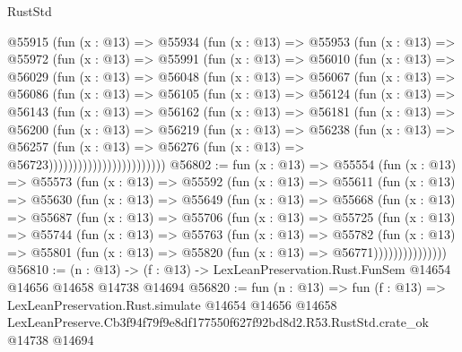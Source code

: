 \begin{lexlean}{RustStd}
\begin{coremodule}
          @55915
            (fun (x : @13) =>
            @55934
              (fun (x : @13) =>
              @55953
                (fun (x : @13) =>
                @55972
                  (fun (x : @13) =>
                  @55991
                    (fun (x : @13) =>
                    @56010
                      (fun (x : @13) =>
                      @56029
                        (fun (x : @13) =>
                        @56048
                          (fun (x : @13) =>
                          @56067
                            (fun (x : @13) =>
                            @56086
                              (fun (x : @13) =>
                              @56105
                                (fun (x : @13) =>
                                @56124
                                  (fun (x : @13) =>
                                  @56143
                                    (fun (x : @13) =>
                                    @56162
                                      (fun (x : @13) =>
                                      @56181
                                        (fun (x : @13) =>
                                        @56200
                                          (fun (x : @13) =>
                                          @56219
                                            (fun (x : @13) =>
                                            @56238
                                              (fun (x : @13) =>
                                              @56257
                                                (fun (x : @13) =>
                                                @56276
                                                  (fun (x : @13) => @56723))))))))))))))))))))))))
@56802 := fun (x : @13) =>
  @55554
    (fun (x : @13) =>
    @55573
      (fun (x : @13) =>
      @55592
        (fun (x : @13) =>
        @55611
          (fun (x : @13) =>
          @55630
            (fun (x : @13) =>
            @55649
              (fun (x : @13) =>
              @55668
                (fun (x : @13) =>
                @55687
                  (fun (x : @13) =>
                  @55706
                    (fun (x : @13) =>
                    @55725
                      (fun (x : @13) =>
                      @55744
                        (fun (x : @13) =>
                        @55763
                          (fun (x : @13) =>
                          @55782
                            (fun (x : @13) =>
                            @55801 (fun (x : @13) => @55820 (fun (x : @13) => @56771)))))))))))))))
@56810 := (n : @13) ->
  (f : @13) -> LexLeanPreservation.Rust.FunSem @14654 @14656 @14658 @14738 @14694
@56820 := fun (n : @13) =>
  fun (f : @13) =>
  LexLeanPreservation.Rust.simulate
    @14654
    @14656
    @14658
    LexLeanPreserve.Cb3f94f79f9e8df177550f627f92bd8d2.R53.RustStd.crate_ok
    @14738
    @14694
\end{coremodule}
\end{lexlean}
